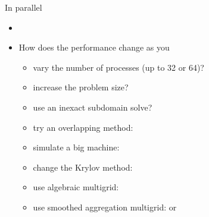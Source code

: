 \begin{frame}{In parallel}
  \begin{itemize}
  \item {}
  \item How does the performance change as you
    \begin{itemize}
    \item vary the number of processes (up to 32 or 64)?
    \item increase the problem size?
    \item use an inexact subdomain solve?
    \item try an overlapping method: 
    \item simulate a big machine: 
    \item change the Krylov method: 
    \item use algebraic multigrid: 
    \item use smoothed aggregation multigrid:  or 
    \end{itemize}
  \end{itemize}
\end{frame}
